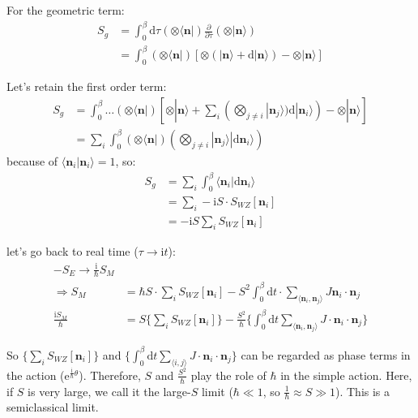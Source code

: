 For the geometric term:
\begin{equation}
\begin{aligned}
S_g &= \int_0^\beta \mathrm{d}\tau (\otimes \langle \bm{n} |) \frac{\partial}{\partial \tau} (\otimes | \bm{n} \rangle) \\
&= \int_0^\beta (\otimes \langle \bm{n} |) [\otimes (| \bm{n} \rangle + \mathrm{d} | \bm{n} \rangle) - \otimes | \bm{n} \rangle ]
\end{aligned}
\end{equation}

Let's retain the first order term:
\begin{equation}
\begin{aligned}
S_g &= \int_0^\beta \dots (\otimes \langle \bm{n} |) [\otimes | \bm{n} \rangle + \sum_i (\bigotimes_{j \neq i} | \bm{n}_j \rangle) \mathrm{d} | \bm{n}_i \rangle ) - \otimes | \bm{n} \rangle] \\
&= \sum_i \int_0^\beta (\otimes \langle \bm{n} |) (\bigotimes_{j \neq i} | \bm{n}_j \rangle | \mathrm{d} \bm{n}_i \rangle)
\end{aligned}
\end{equation}
because of $\langle \bm{n}_i | \bm{n}_i \rangle = 1$, so:
\begin{equation}
\begin{aligned}
S_g &= \sum_i \int_0^\beta \langle \bm{n}_i | \mathrm{d} \bm{n}_i \rangle \\
&= \sum_i -\mathrm{i} S \cdot S_{WZ} [\bm{n}_i] \\
&= -\mathrm{i} S \sum_i S_{WZ} [\bm{n}_i]
\end{aligned}
\end{equation}

let's go back to real time ($\tau \to \mathrm{i} t$):
\begin{equation}
    \begin{aligned}
-S_E \to \frac{\mathrm{i}}{\hbar} S_M \\
\Rightarrow S_M &= \hbar S \cdot \sum_i S_{WZ}[\bm{n}_i] - S^2 \int_0^\beta \mathrm{d}t \cdot \sum_{\langle \bm{n}_i, \bm{n}_j \rangle} J \bm{n}_i \cdot \bm{n}_j \\
\frac{\mathrm{i} S_M}{\hbar} &= S \{ \sum_i S_{WZ} [\bm{n}_i] \} - \frac{S^2}{\hbar} \{ \int_0^\beta \mathrm{d}t \sum_{\langle \bm{n}_i, \bm{n}_j \rangle} J \cdot \bm{n}_i \cdot \bm{n}_j \}
\end{aligned}
\end{equation}

So $\{ \sum_i S_{WZ} [\bm{n}_i] \}$ and $\{ \int_0^\beta \mathrm{d}t \sum_{\langle i,j \rangle} J \cdot \bm{n}_i \cdot \bm{n}_j \}$ can be regarded as phase terms in the action ($\mathrm{e}^{\frac{\mathrm{i}}{\hbar} \theta}$). Therefore, $S$ and $\frac{S^2}{\hbar}$ play the role of $\hbar$ in the simple action.
Here, if $S$ is very large, we call it the large-$S$ limit ($\hbar \ll 1$, so $\frac{1}{\hbar} \approx S \gg 1$).
This is a semiclassical limit.

